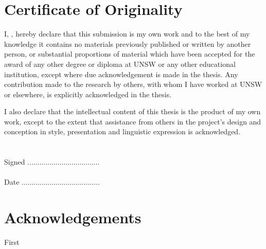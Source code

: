 


\chapter*{Certificate of Originality}
I, \authorname, hereby declare that this submission is my own work and to the best of my knowledge it contains no materials previously published or written by another person, or substantial proportions of material which have been accepted for the award of any other degree or diploma at UNSW or any other educational institution, except where due acknowledgement is made in the thesis. Any contribution made to the research by others, with whom I have worked at UNSW or elsewhere, is explicitly acknowledged in the thesis.

I also declare that the intellectual content of this thesis is the product of my own work, except to the extent that assistance from others in the project’s design and conception in style, presentation and linguistic expression is acknowledged.\\
\\
\\
Signed  ....................................\\
\\
Date    .......................................

\chapter*{Acknowledgements}
\begin{itemize*}
\item First
\end{itemize*}

\tableofcontents 
\listoffigures
\clearpage

